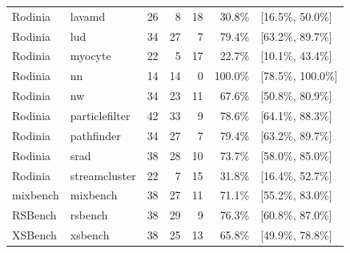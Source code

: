 \begin{table}[t]
\begin{tabular}{@{}llrrrrl@{}}
Rodinia & lavamd & 26 & 8 & 18 & 30.8\% & [16.5\%, 50.0\%] \\
Rodinia & lud & 34 & 27 & 7 & 79.4\% & [63.2\%, 89.7\%] \\
Rodinia & myocyte & 22 & 5 & 17 & 22.7\% & [10.1\%, 43.4\%] \\
Rodinia & nn & 14 & 14 & 0 & 100.0\% & [78.5\%, 100.0\%] \\
Rodinia & nw & 34 & 23 & 11 & 67.6\% & [50.8\%, 80.9\%] \\
Rodinia & particlefilter & 42 & 33 & 9 & 78.6\% & [64.1\%, 88.3\%] \\
Rodinia & pathfinder & 34 & 27 & 7 & 79.4\% & [63.2\%, 89.7\%] \\
Rodinia & srad & 38 & 28 & 10 & 73.7\% & [58.0\%, 85.0\%] \\
Rodinia & streamcluster & 22 & 7 & 15 & 31.8\% & [16.4\%, 52.7\%] \\
\midrule
mixbench & mixbench & 38 & 27 & 11 & 71.1\% & [55.2\%, 83.0\%] \\
RSBench & rsbench & 38 & 29 & 9 & 76.3\% & [60.8\%, 87.0\%] \\
XSBench & xsbench & 38 & 25 & 13 & 65.8\% & [49.9\%, 78.8\%] \\
\bottomrule
\end{tabular}
\end{table}


